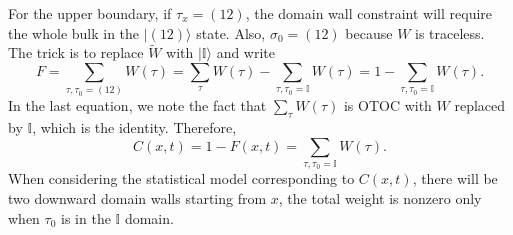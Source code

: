 \documentclass{SciPost}
\begin{document}
For the upper boundary, if $\tau_x = (12)$, the domain wall constraint will require the whole bulk in the $|(12)\rangle$ state. 
Also, $\sigma_0 = (12)$ because $W$ is traceless.
The trick is to replace $\tilde W$ with $|\mathbb I\rangle$ and write
\begin{equation}
	F = \sum_{\tau,\tau_0=(12)} W(\tau) 
	= \sum_\tau W(\tau) - \sum_{\tau,\tau_0=\mathbb I} W(\tau)
	= 1 - \sum_{\tau,\tau_0=\mathbb I} W(\tau).
\end{equation}
In the last equation, we note the fact that $\sum_\tau W(\tau)$ is OTOC with $W$ replaced by $\mathbb I$, which is the identity.
Therefore, 
\begin{equation}
	C(x,t) = 1 - F(x,t) = \sum_{\tau,\tau_0=\mathbb I} W(\tau).
\end{equation}
When considering the statistical model corresponding to $C(x,t)$, there will be two downward domain walls starting from $x$, the total weight is nonzero only when $\tau_0$ is in the $\mathbb I$ domain.
\end{document}
